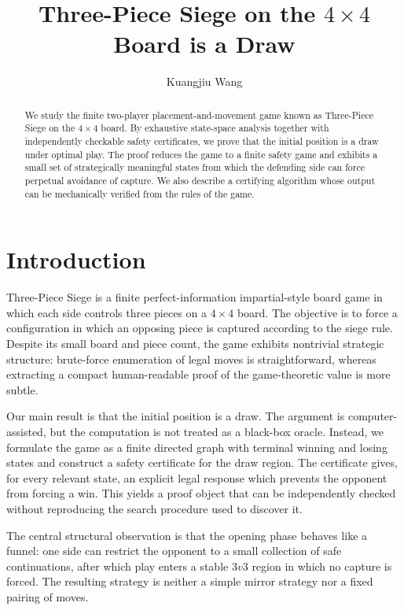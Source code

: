 \documentclass[11pt,a4paper]{article}
\title{Three-Piece Siege on the $4\times4$ Board is a Draw}
\author{Kuangjiu Wang}
\date{}
\theoremstyle{plain}
\theoremstyle{definition}
\begin{document}
\maketitle
\begin{abstract}
We study the finite two-player placement-and-movement game known as Three-Piece Siege on the $4\times4$ board. By exhaustive state-space analysis together with independently checkable safety certificates, we prove that the initial position is a draw under optimal play. The proof reduces the game to a finite safety game and exhibits a small set of strategically meaningful states from which the defending side can force perpetual avoidance of capture. We also describe a certifying algorithm whose output can be mechanically verified from the rules of the game.
\end{abstract}
\section{Introduction}
Three-Piece Siege is a finite perfect-information impartial-style board game in which each side controls three pieces on a $4\times4$ board. The objective is to force a configuration in which an opposing piece is captured according to the siege rule. Despite its small board and piece count, the game exhibits nontrivial strategic structure: brute-force enumeration of legal moves is straightforward, whereas extracting a compact human-readable proof of the game-theoretic value is more subtle.

Our main result is that the initial position is a draw. The argument is computer-assisted, but the computation is not treated as a black-box oracle. Instead, we formulate the game as a finite directed graph with terminal winning and losing states and construct a safety certificate for the draw region. The certificate gives, for every relevant state, an explicit legal response which prevents the opponent from forcing a win. This yields a proof object that can be independently checked without reproducing the search procedure used to discover it.

The central structural observation is that the opening phase behaves like a funnel: one side can restrict the opponent to a small collection of safe continuations, after which play enters a stable $3v3$ region in which no capture is forced. The resulting strategy is neither a simple mirror strategy nor a fixed pairing of moves.
\end{document}
